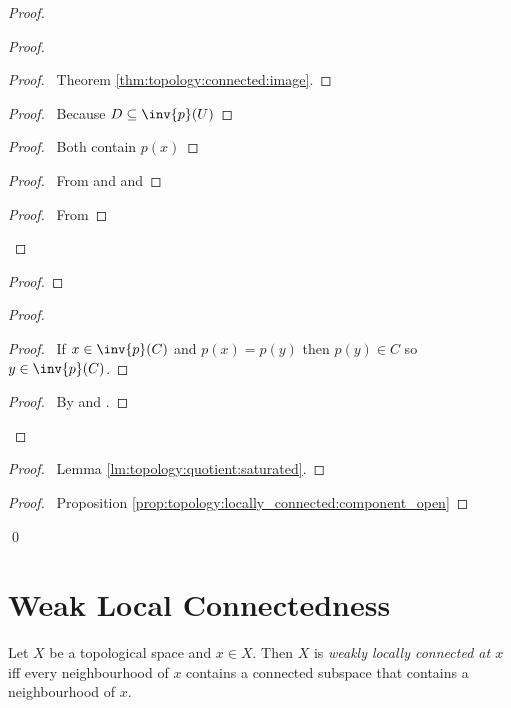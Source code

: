 \begin{proof}
  \pf
  \begin{proof}
    \begin{proof}
      \pf\ Theorem \ref{thm:topology:connected:image}.
    \end{proof}
    \begin{proof}
      \pf\ Because $D \subseteq \inv{p}(U)$
    \end{proof}
    \begin{proof}
      \pf\ Both contain $p(x)$
    \end{proof}
    \begin{proof}
      \pf\ From  and  and 
    \end{proof}
    \begin{proof}
      \pf\ From 
    \end{proof}
  \end{proof}
  \begin{proof}
  \end{proof}
  \begin{proof}
    \begin{proof}
      \pf\ If $x \in \inv{p}(C)$ and $p(x) = p(y)$ then $p(y) \in C$ so $y \in \inv{p}(C)$.
    \end{proof}
    \begin{proof}
      \pf\ By  and .
    \end{proof}
  \end{proof}
  \begin{proof}
    \pf\ Lemma \ref{lm:topology:quotient:saturated}.
  \end{proof}
  \qedstep
  \begin{proof}
    \pf\ Proposition \ref{prop:topology:locally_connected:component_open}
  \end{proof}
  \qed
\end{proof}

\section{Weak Local Connectedness}


\begin{df}
  Let $X$ be a topological space and $x \in X$. Then $X$ is \emph{weakly
    locally connected at $x$} iff every neighbourhood of $x$ contains a
  connected subspace that contains a neighbourhood of $x$.
\end{df}
